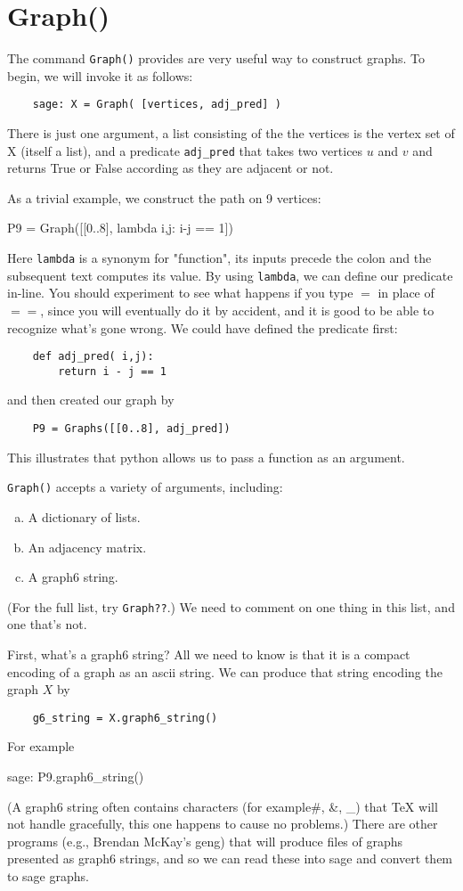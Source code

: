 {\section{Graph()}

The command \verb|Graph()| provides are very useful way to construct graphs.
To begin, we will invoke it as follows:
\begin{verbatim}
    sage: X = Graph( [vertices, adj_pred] )
\end{verbatim}
There is just one argument, a list consisting of the
the vertices is the vertex set of X (itself a list), and a predicate
\verb|adj_pred| that takes two vertices $u$ and $v$ and returns True or
False according as they are adjacent or not.

As a trivial example, we construct the path on 9 vertices:
\begin{sageblock}
    P9 = Graph([[0..8], lambda i,j: i-j == 1])
\end{sageblock}
Here \verb|lambda| is a synonym for "function", its inputs precede the colon
and the subsequent text computes its value. By using \verb|lambda|, we can define
our predicate in-line. You should experiment to see what happens if you type 
$=$ in place of $==$, since you will eventually do it by accident, and it is good to
be able to recognize what's gone wrong.
We could have defined the predicate first:
\begin{verbatim}
    def adj_pred( i,j):
        return i - j == 1
\end{verbatim}
and then created our graph by
\begin{verbatim}
    P9 = Graphs([[0..8], adj_pred])
\end{verbatim}
This illustrates that python allows us to pass a function as an argument.

\verb|Graph()| accepts a variety of arguments, including:
\begin{enumerate}[(a)]
    \item
    A dictionary of lists.
    \item
    An adjacency matrix.
    \item
    A graph6 string.
\end{enumerate}
(For the full list, try \verb|Graph??|.) We need to comment on one thing in
this list, and one that's not.

First, what's a graph6 string? All we need to know is that it is a compact
encoding of a graph as an ascii string.  We can produce that string encoding
the graph $X$ by
\begin{verbatim}
    g6_string = X.graph6_string()
\end{verbatim}
For example
\begin{sageexample}
    sage: P9.graph6_string()
\end{sageexample}
(A graph6 string often contains characters (for example\#, \&, \_) that \TeX{} 
will not handle gracefully, this one happens to cause no problems.)
There are other programs (e.g., Brendan McKay's geng) that will produce files of
graphs presented as graph6 strings, and so we can read these into
sage and convert them to sage graphs. 

}
